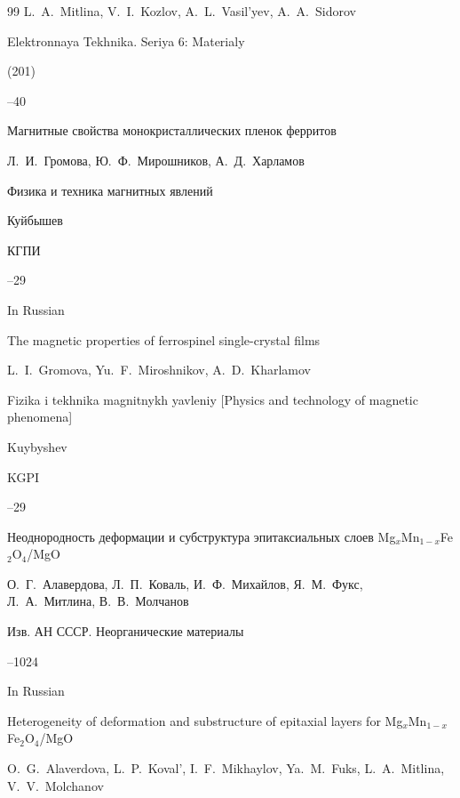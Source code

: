 \begin{thebibliography}{99}
\by L.~A.~Mitlina, V.~I.~Kozlov, A.~L.~Vasil'yev, A.~A.~Sidorov

\jour Elektronnaya Tekhnika. Seriya 6: Materialy


 (201)

--40




\paper  Магнитные свойства монокристаллических  пленок ферритов 

\by Л.~И.~Громова, Ю.~Ф.~Мирошников, А.~Д.~Харламов

\inbook Физика и техника магнитных явлений

\publaddr Куйбышев

\publ КГПИ


--29

\misctransl

\lang In Russian

\paper The magnetic properties of ferrospinel single-crystal films

\by L.~I.~Gromova, Yu.~F.~Miroshnikov, A.~D.~Kharlamov

\inbook Fizika i tekhnika magnitnykh yavleniy \rm [Physics and technology of magnetic phenomena]

\publaddr Kuybyshev

\publ KGPI


--29




\paper Неоднородность деформации и субструктура эпитаксиальных слоев  Mg$_x$Mn$_{1-x}$Fe$_2$O$_4$/MgO 

\by О.~Г.~Алавердова, Л.~П.~Коваль, И.~Ф.~Михайлов, Я.~М.~Фукс, Л.~А.~Митлина, В.~В.~Молчанов 

\jour Изв. АН СССР. Неорганические материалы




--1024

\misctransl

\lang In Russian

\paper Heterogeneity of deformation and substructure of epitaxial layers for Mg$_x$Mn$_{1-x}$Fe$_2$O$_4$/MgO 

\by O.~G.~Alaverdova, L.~P.~Koval', I.~F.~Mikhaylov, Ya.~M.~Fuks, L.~A.~Mitlina, V.~V.~Molchanov


\end{thebibliography}
